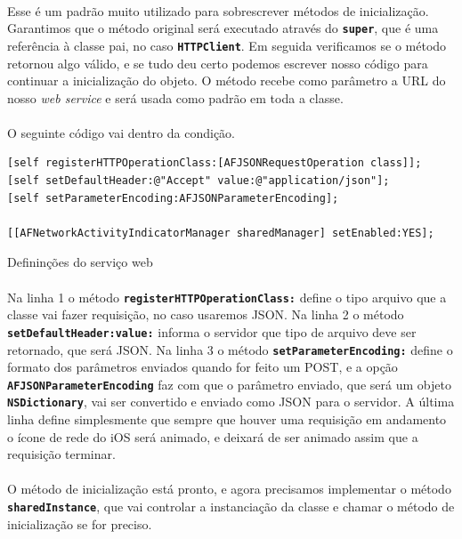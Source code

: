 \documentclass[a4paper,12pt,brazil,doubleside]{book}
\begin{document}
\begin{singlespace}
\paragraph{}Esse é um padrão muito utilizado para sobrescrever métodos de inicialização. Garantimos que o método original será executado através do \texttt{\textbf{super}}, que é uma referência à classe pai, no caso  \texttt{\textbf{HTTPClient}}. Em seguida verificamos se o método retornou algo válido, e se tudo deu certo podemos escrever nosso código para continuar a inicialização do objeto. O método recebe como parâmetro a URL do nosso \emph{web service} e será usada como padrão em toda a classe.
\paragraph{}O seguinte código vai dentro da condição.

\begin{listing}[H]
\begin{verbatim}
[self registerHTTPOperationClass:[AFJSONRequestOperation class]];
[self setDefaultHeader:@"Accept" value:@"application/json"];
[self setParameterEncoding:AFJSONParameterEncoding];

[[AFNetworkActivityIndicatorManager sharedManager] setEnabled:YES];
\end{verbatim}
\caption{Defininções do serviço web}
\end{listing}

\paragraph{}Na linha 1 o método \texttt{\textbf{registerHTTPOperationClass:}} define o tipo arquivo que a classe vai fazer requisição, no caso usaremos JSON. Na linha 2 o método\\ \texttt{\textbf{setDefaultHeader:value:}} informa o servidor que tipo de arquivo deve ser retornado, que será JSON. Na linha 3 o método \texttt{\textbf{setParameterEncoding:}} define o formato dos parâmetros enviados quando for feito um POST, e a opção \texttt{\textbf{AFJSONParameterEncoding}} faz com que o parâmetro enviado, que será um objeto \texttt{\textbf{NSDictionary}}, vai ser convertido e enviado como JSON para o servidor. A última linha define simplesmente que sempre que houver uma requisição em andamento o ícone de rede do iOS será animado, e deixará de ser animado assim que a requisição terminar.
\paragraph{}O método de inicialização está pronto, e agora precisamos implementar o método\\ \texttt{\textbf{sharedInstance}}, que vai controlar a instanciação da classe e chamar o método de inicialização se for preciso.


\end{singlespace}
\end{document}
